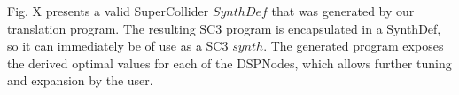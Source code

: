 Fig. X   presents a valid SuperCollider $SynthDef$ that was generated by our translation program.
The resulting SC3 program is encapsulated in a SynthDef, so it can immediately be of use as a SC3 $synth$.
The generated program exposes the derived optimal values for each of the DSPNodes, which allows further tuning and expansion by the user.

